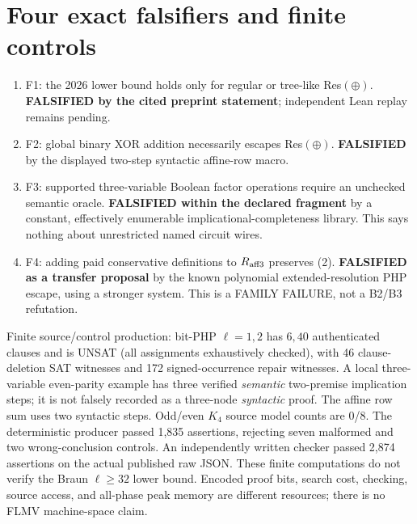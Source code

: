 \documentclass[11pt]{article}
\begin{document}
\section*{Four exact falsifiers and finite controls}
\begin{enumerate}
\item[] F1: the 2026 lower bound holds only for regular or tree-like Res$(\oplus)$. \textbf{FALSIFIED by the cited preprint statement}; independent Lean replay remains pending.
\item[] F2: global binary XOR addition necessarily escapes Res$(\oplus)$. \textbf{FALSIFIED} by the displayed two-step syntactic affine-row macro.
\item[] F3: supported three-variable Boolean factor operations require an unchecked semantic oracle. \textbf{FALSIFIED within the declared fragment} by a constant, effectively enumerable implicational-completeness library. This says nothing about unrestricted named circuit wires.
\item[] F4: adding paid conservative definitions to $R_{\rm aff3}$ preserves (2). \textbf{FALSIFIED as a transfer proposal} by the known polynomial extended-resolution PHP escape, using a stronger system. This is a FAMILY FAILURE, not a B2/B3 refutation.
\end{enumerate}
Finite source/control production: bit-PHP $\ell=1,2$ has $6,40$ authenticated clauses and is UNSAT (all assignments exhaustively checked), with 46 clause-deletion SAT witnesses and 172 signed-occurrence repair witnesses. A local three-variable even-parity example has three verified \emph{semantic} two-premise implication steps; it is not falsely recorded as a three-node \emph{syntactic} proof. The affine row sum uses two syntactic steps. Odd/even $K_4$ source model counts are 0/8. The deterministic producer passed 1,835 assertions, rejecting seven malformed and two wrong-conclusion controls. An independently written checker passed 2,874 assertions on the actual published raw JSON. These finite computations do not verify the Braun $\ell\ge32$ lower bound. Encoded proof bits, search cost, checking, source access, and all-phase peak memory are different resources; there is no FLMV machine-space claim.
\end{document}
